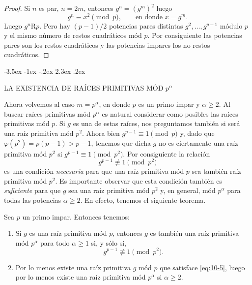 \documentclass[12pt,a4paper]{book}
\makeatletter
\renewcommand\section{\@startsection{section}{1}{\z@}%
  {-3.5ex \@plus -1ex \@minus -.2ex}%
  {2.3ex \@plus .2ex}%
  {\normalfont\Large\bfseries\raggedright}}
\makeatother
\begin{document}
    \begin{proof}
        Si $n$ es par, $n=2m$, entonces $g^{n}=(g^{m})^{2}$ luego
        \begin{equation*}
            g^{n}\equiv x^{2}\pmod{p},\qquad\text{en donde }x=g^{m}.
        \end{equation*}
        Luego $g^{n}\mathrm{R}p$. Pero hay $(p-1)/2$ potencias pares distintas
        $g^{2},\dots,g^{p-1}$ módulo $p$ y el mismo número de restos cuadráticos mód $p$. Por
        consiguiente las potencias pares son los restos cuadráticos y las potencias impares
        los no restos cuadráticos.
    \end{proof}

    \section{LA EXISTENCIA DE RAÍCES PRIMITIVAS MÓD \texorpdfstring{$p^{\alpha}$}{p\textasciicircum{}α}}

    Ahora volvemos al caso $m=p^{\alpha}$, en donde $p$ es un primo impar y $\alpha\geq2$.
    Al buscar raíces primitivas mód $p^{\alpha}$ es natural considerar como posibles las
    raíces primitivas mód $p$. Si $g$ es una de estas raíces, nos preguntamos también si
    será una raíz primitiva mód $p^{2}$. Ahora bien $g^{p-1}\equiv1\pmod{p}$ y, dado que
    $\varphi(p^{2})=p(p-1)>p-1$, tenemos que dicha $g$ no es ciertamente una raíz primitiva
    mód $p^{2}$ si $g^{p-1}\equiv1\pmod{p^{2}}$. Por consiguiente la relación
    \begin{equation*}
        g^{p-1}\not\equiv1\pmod{p^{2}}
    \end{equation*}
    es una condición \textit{necesaria} para que una raíz primitiva mód $p$ sea también raíz
    primitiva mód $p^{2}$. Es importante observar que esta condición también es
    \textit{suficiente} para que $g$ sea una raíz primitiva mód $p^{2}$ y, en general, mód
    $p^{\alpha}$ para todas las potencias $\alpha\geq2$. En efecto, tenemos el siguiente
    teorema.

    \begin{teorema}\label{teo:10-6}
        Sea $p$ un primo impar. Entonces tenemos:
        \begin{enumerate}
            \item[(a)] Si $g$ es una raíz primitiva mód $p$, entonces $g$ es también una raíz
            primitiva mód $p^{\alpha}$ para todo $\alpha\geq1$ si, y sólo si,
            \begin{equation}\label{eq:10-5}
                g^{p-1}\not\equiv1\pmod{p^{2}}.
            \end{equation}
            \item[(b)] Por lo menos existe una raíz primitiva $g$ mód $p$ que satisface
            \eqref{eq:10-5}, luego por lo menos existe una raíz primitiva mód $p^{\alpha}$ si
            $\alpha\geq2$.
        \end{enumerate}
    \end{teorema}
\end{document}
